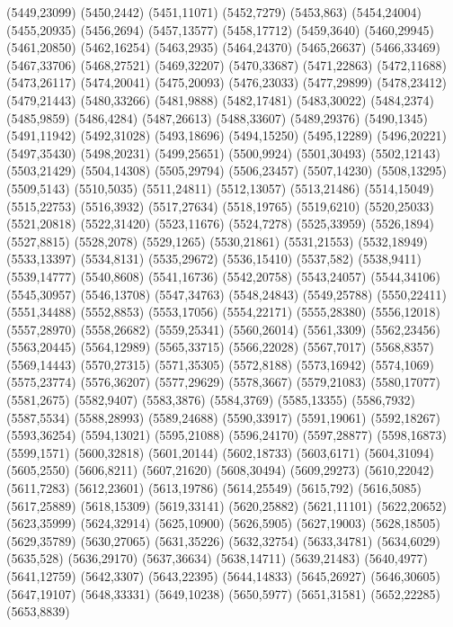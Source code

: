 (5449,23099)
(5450,2442)
(5451,11071)
(5452,7279)
(5453,863)
(5454,24004)
(5455,20935)
(5456,2694)
(5457,13577)
(5458,17712)
(5459,3640)
(5460,29945)
(5461,20850)
(5462,16254)
(5463,2935)
(5464,24370)
(5465,26637)
(5466,33469)
(5467,33706)
(5468,27521)
(5469,32207)
(5470,33687)
(5471,22863)
(5472,11688)
(5473,26117)
(5474,20041)
(5475,20093)
(5476,23033)
(5477,29899)
(5478,23412)
(5479,21443)
(5480,33266)
(5481,9888)
(5482,17481)
(5483,30022)
(5484,2374)
(5485,9859)
(5486,4284)
(5487,26613)
(5488,33607)
(5489,29376)
(5490,1345)
(5491,11942)
(5492,31028)
(5493,18696)
(5494,15250)
(5495,12289)
(5496,20221)
(5497,35430)
(5498,20231)
(5499,25651)
(5500,9924)
(5501,30493)
(5502,12143)
(5503,21429)
(5504,14308)
(5505,29794)
(5506,23457)
(5507,14230)
(5508,13295)
(5509,5143)
(5510,5035)
(5511,24811)
(5512,13057)
(5513,21486)
(5514,15049)
(5515,22753)
(5516,3932)
(5517,27634)
(5518,19765)
(5519,6210)
(5520,25033)
(5521,20818)
(5522,31420)
(5523,11676)
(5524,7278)
(5525,33959)
(5526,1894)
(5527,8815)
(5528,2078)
(5529,1265)
(5530,21861)
(5531,21553)
(5532,18949)
(5533,13397)
(5534,8131)
(5535,29672)
(5536,15410)
(5537,582)
(5538,9411)
(5539,14777)
(5540,8608)
(5541,16736)
(5542,20758)
(5543,24057)
(5544,34106)
(5545,30957)
(5546,13708)
(5547,34763)
(5548,24843)
(5549,25788)
(5550,22411)
(5551,34488)
(5552,8853)
(5553,17056)
(5554,22171)
(5555,28380)
(5556,12018)
(5557,28970)
(5558,26682)
(5559,25341)
(5560,26014)
(5561,3309)
(5562,23456)
(5563,20445)
(5564,12989)
(5565,33715)
(5566,22028)
(5567,7017)
(5568,8357)
(5569,14443)
(5570,27315)
(5571,35305)
(5572,8188)
(5573,16942)
(5574,1069)
(5575,23774)
(5576,36207)
(5577,29629)
(5578,3667)
(5579,21083)
(5580,17077)
(5581,2675)
(5582,9407)
(5583,3876)
(5584,3769)
(5585,13355)
(5586,7932)
(5587,5534)
(5588,28993)
(5589,24688)
(5590,33917)
(5591,19061)
(5592,18267)
(5593,36254)
(5594,13021)
(5595,21088)
(5596,24170)
(5597,28877)
(5598,16873)
(5599,1571)
(5600,32818)
(5601,20144)
(5602,18733)
(5603,6171)
(5604,31094)
(5605,2550)
(5606,8211)
(5607,21620)
(5608,30494)
(5609,29273)
(5610,22042)
(5611,7283)
(5612,23601)
(5613,19786)
(5614,25549)
(5615,792)
(5616,5085)
(5617,25889)
(5618,15309)
(5619,33141)
(5620,25882)
(5621,11101)
(5622,20652)
(5623,35999)
(5624,32914)
(5625,10900)
(5626,5905)
(5627,19003)
(5628,18505)
(5629,35789)
(5630,27065)
(5631,35226)
(5632,32754)
(5633,34781)
(5634,6029)
(5635,528)
(5636,29170)
(5637,36634)
(5638,14711)
(5639,21483)
(5640,4977)
(5641,12759)
(5642,3307)
(5643,22395)
(5644,14833)
(5645,26927)
(5646,30605)
(5647,19107)
(5648,33331)
(5649,10238)
(5650,5977)
(5651,31581)
(5652,22285)
(5653,8839)
